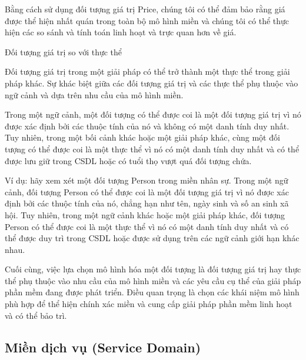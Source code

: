 Bằng cách sử dụng đối tượng giá trị Price, chúng tôi có thể đảm bảo rằng giá được thể hiện nhất quán trong toàn bộ mô hình miền và chúng tôi có thể thực hiện các so sánh và tính toán linh hoạt và trực quan hơn về giá.

Đối tượng giá trị so với thực thể

Đối tượng giá trị trong một giải pháp có thể trở thành một thực thể trong giải pháp khác. Sự khác biệt giữa các đối tượng giá trị và các thực thể phụ thuộc vào ngữ cảnh và dựa trên nhu cầu của mô hình miền.

Trong một ngữ cảnh, một đối tượng có thể được coi là một đối tượng giá trị vì nó được xác định bởi các thuộc tính của nó và không có một danh tính duy nhất. Tuy nhiên, trong một bối cảnh khác hoặc một giải pháp khác, cùng một đối tượng có thể được coi là một thực thể vì nó có một danh tính duy nhất và có thể được lưu giữ trong CSDL hoặc có tuổi thọ vượt quá đối tượng chứa.

Ví dụ: hãy xem xét một đối tượng Person trong miền nhân sự. Trong một ngữ cảnh, đối tượng Person có thể được coi là một đối tượng giá trị vì nó được xác định bởi các thuộc tính của nó, chẳng hạn như tên, ngày sinh và số an sinh xã hội. Tuy nhiên, trong một ngữ cảnh khác hoặc một giải pháp khác, đối tượng Person có thể được coi là một thực thể vì nó có một danh tính duy nhất và có thể được duy trì trong CSDL hoặc được sử dụng trên các ngữ cảnh giới hạn khác nhau.

Cuối cùng, việc lựa chọn mô hình hóa một đối tượng là đối tượng giá trị hay thực thể phụ thuộc vào nhu cầu của mô hình miền và các yêu cầu cụ thể của giải pháp phần mềm đang được phát triển. Điều quan trọng là chọn các khái niệm mô hình phù hợp để thể hiện chính xác miền và cung cấp giải pháp phần mềm linh hoạt và có thể bảo trì.




\subsection{Miền dịch vụ (Service Domain)}


